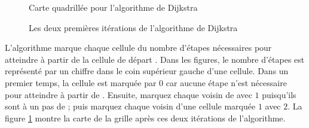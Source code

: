 \begin{figure}
\begin{minipage}{.5\textwidth}
\caption{Carte quadrillée pour l'algorithme de Dijkstra}
\label{fig.dijkstra-simple}
\end{minipage}
\hspace{\fill}
\begin{minipage}{.5\textwidth}
\caption{Les deux premières itérations de l'algorithme de Dijkstra}
\label{fig.dijkstra-simple-2}
\end{minipage}
\end{figure}

L'algorithme marque chaque cellule  du nombre d'étapes nécessaires pour atteindre  à partir de la cellule de départ . Dans les figures, le nombre d'étapes est représenté par un chiffre dans le coin supérieur gauche d'une cellule. Dans un premier temps, la cellule  est marquée par $0$ car aucune étape n'est nécessaire pour atteindre  à partir de . Ensuite, marquez chaque voisin de  avec $1$ puisqu'ils sont à un pas de  ; puis marquez chaque voisin d'une cellule marquée $1$ avec $2$. La figure \ref{fig.dijkstra-simple-2} montre la carte de la grille après ces deux itérations de l'algorithme.

